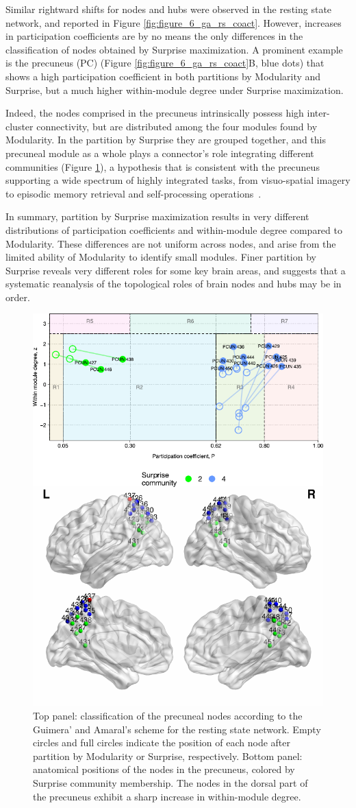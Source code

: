 Similar rightward shifts for nodes and hubs were observed in the resting state network, and reported in Figure \ref{fig:figure_6_ga_rs_coact}.
However, increases in participation coefficients are by no means the only differences in the classification of nodes obtained by Surprise maximization. A prominent example is the precuneus (PC) (Figure \ref{fig:figure_6_ga_rs_coact}B, blue dots) that shows a high participation coefficient in both partitions by Modularity and Surprise, but a much higher within-module degree under Surprise maximization.

Indeed, the nodes comprised in the precuneus intrinsically possess high inter-cluster connectivity, but are distributed among the four modules found by Modularity. In the partition by Surprise they are grouped together, and this precuneal module as a whole plays a connector's role integrating different communities (Figure \ref{fig:figure_8_ga_rs_precuneus}), a hypothesis that is consistent with the precuneus supporting a wide spectrum of highly integrated tasks, from visuo-spatial imagery to episodic memory retrieval and self-processing operations~\cite{cavanna2006}.

In summary, partition by Surprise maximization results in very different distributions of participation coefficients and within-module degree compared to Modularity. These differences are not uniform across nodes, and arise from the limited ability of Modularity to identify small modules. Finer partition by Surprise reveals very different roles for some key brain areas, and suggests that a systematic reanalysis of the topological roles of brain nodes and hubs may be in order.

\begin{figure}[htb!]
\centering
\includegraphics[width=0.5\linewidth]{images/figure_8_precuneus.pdf}
\caption{Top panel: classification of the precuneal nodes according to the Guimera' and Amaral's scheme for the resting state network. Empty circles and full circles indicate the position of each node after partition by Modularity or Surprise, respectively. Bottom panel: anatomical positions of the nodes in the precuneus, colored by Surprise community membership. The nodes in the dorsal part of the precuneus exhibit a sharp increase in within-module degree.}
\label{fig:figure_8_ga_rs_precuneus}
\end{figure}

